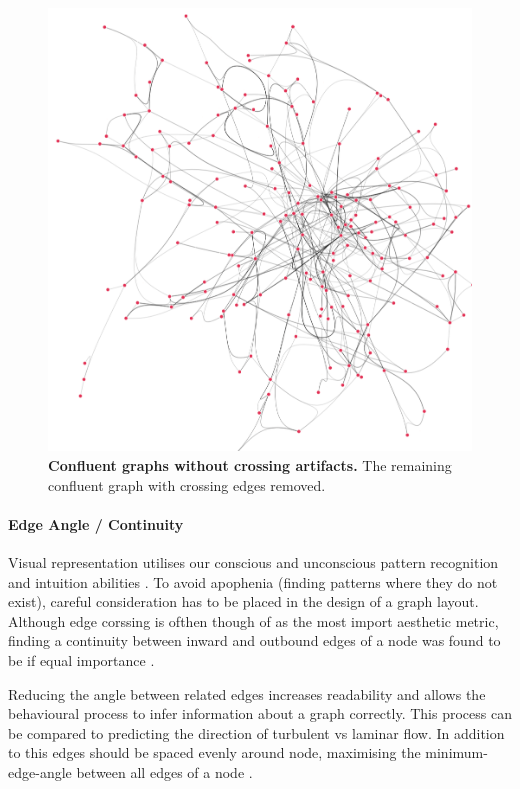 \begin{figure}[H]
     \centering
     \includegraphics[width=.6\textwidth]{figures_c1/layout/confluent/4.png}
        \caption{\textbf{Confluent graphs without crossing artifacts.} The remaining confluent graph with crossing edges removed. }
      \label{fig:conf4}
\end{figure}



\paragraph{ Edge Angle / Continuity}
Visual representation utilises our conscious and unconscious pattern recognition and intuition abilities \citep{pattern}. To avoid apophenia (finding patterns where they do not exist), careful  consideration has to be placed in the design of a graph layout. 
Although edge corssing is ofthen though of as the most import aesthetic metric, finding a continuity between inward and outbound edges of a node was found to be if equal importance \citep{continuity}.

Reducing the angle between related edges increases readability and allows the behavioural process to infer information about a graph correctly. This process can be compared to predicting the direction of turbulent vs laminar flow. In addition to this edges should be spaced evenly around node, maximising the minimum-edge-angle between all edges of a node \citep{aestheticsgraphvis}. 



